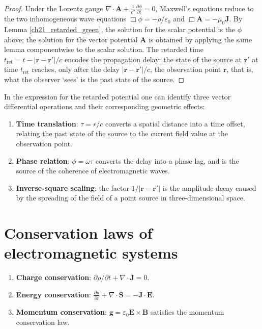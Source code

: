 \begin{proof}
Under the Lorentz gauge $\nabla\cdot\mathbf{A} + \frac{1}{c^2}\frac{\partial\phi}{\partial t} = 0$, Maxwell's equations reduce to the two inhomogeneous wave equations $\Box\phi = -\rho/\varepsilon_0$ and $\Box\mathbf{A} = -\mu_0\mathbf{J}$. By Lemma \ref{ch21_retarded_green}, the solution for the scalar potential is the $\phi$ above; the solution for the vector potential $\mathbf{A}$ is obtained by applying the same lemma componentwise to the scalar solution. The retarded time $t_{\text{ret}} = t - |\mathbf{r}-\mathbf{r}'|/c$ encodes the propagation delay: the state of the source at $\mathbf{r}'$ at time $t_{\text{ret}}$ reaches, only after the delay $|\mathbf{r}-\mathbf{r}'|/c$, the observation point $\mathbf{r}$, that is, what the observer `sees' is the past state of the source.
\end{proof}

\begin{property}\label{prop:retarded_delay_grammar}
In the expression for the retarded potential one can identify three vector differential operations and their corresponding geometric effects:
\begin{enumerate}[label=(\roman*)]
    \item \textbf{Time translation}: $\tau = r/c$ converts a spatial distance into a time offset, relating the past state of the source to the current field value at the observation point.
    \item \textbf{Phase relation}: $\phi = \omega\tau$ converts the delay into a phase lag, and is the source of the coherence of electromagnetic waves.
    \item \textbf{Inverse-square scaling}: the factor $1/|\mathbf{r}-\mathbf{r}'|$ is the amplitude decay caused by the spreading of the field of a point source in three-dimensional space.
\end{enumerate}
\end{property}

\section{Conservation laws of electromagnetic systems}

\begin{theorem}\label{thm:electromagnetic_conservation}
\begin{enumerate}[label=(\roman*)]
    \item \textbf{Charge conservation}: $\partial\rho/\partial t + \nabla \cdot \mathbf{J} = 0$.
    \item \textbf{Energy conservation}: $\frac{\partial u}{\partial t} + \nabla \cdot \mathbf{S} = -\mathbf{J} \cdot \mathbf{E}$.
    \item \textbf{Momentum conservation}: $\mathbf{g} = \varepsilon_0 \mathbf{E} \times \mathbf{B}$ satisfies the momentum conservation law.
\end{enumerate}
\end{theorem}

